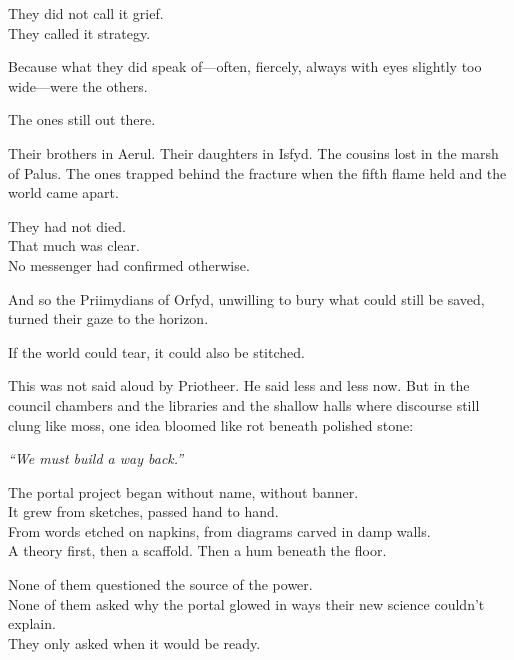 \documentclass[12pt]{article}
\begin{document}
\vspace{0.5em}
They did not call it grief.\\
They called it strategy.

\vspace{0.5em}
Because what they did speak of---often, fiercely, always with eyes slightly too wide---were the others.

\vspace{0.5em}
The ones still out there.

\vspace{0.5em}
Their brothers in Aerul. Their daughters in Isfyd. The cousins lost in the marsh of Palus. The ones trapped behind the fracture when the fifth flame held and the world came apart.

\vspace{0.5em}
They had not died.\\
That much was clear.\\
No messenger had confirmed otherwise.

\vspace{0.5em}
And so the Priimydians of Orfyd, unwilling to bury what could still be saved, turned their gaze to the horizon.

\vspace{0.5em}
If the world could tear, it could also be stitched.

\vspace{0.5em}
This was not said aloud by Priotheer. He said less and less now. But in the council chambers and the libraries and the shallow halls where discourse still clung like moss, one idea bloomed like rot beneath polished stone:

\vspace{0.5em}
\textit{``We must build a way back.''}

\vspace{0.5em}
The portal project began without name, without banner.\\
It grew from sketches, passed hand to hand.\\
From words etched on napkins, from diagrams carved in damp walls.\\
A theory first, then a scaffold. Then a hum beneath the floor.

\vspace{0.5em}
None of them questioned the source of the power.\\
None of them asked why the portal glowed in ways their new science couldn’t explain.\\
They only asked when it would be ready.
\end{document}
